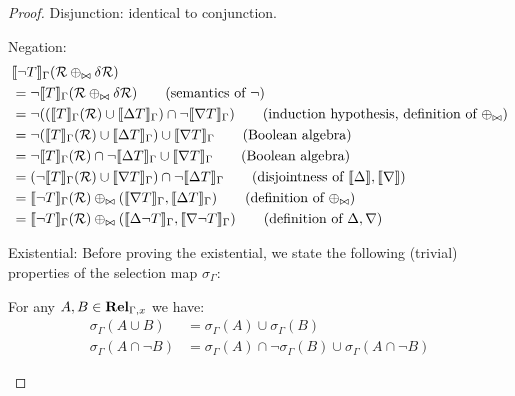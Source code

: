 \begin{proof}
  Disjunction: identical to conjunction.
  
  Negation:
  \begin{align*}
    &\sem{\neg T}_\Gamma(\semR \twist \diffR)\\
    &= \neg \sem{T}_\Gamma(\semR \twist \diffR) \tag{semantics of $\neg$}\\
    &= \neg ((\sem{T}_\Gamma(\semR) \cup \upsem{T}_\Gamma) \cap \neg \downsem{T}_\Gamma) \tag{induction hypothesis, definition of $\twist$}\\
    &= \neg (\sem{T}_\Gamma(\semR) \cup \upsem{T}_\Gamma) \cup \downsem{T}_\Gamma \tag{Boolean algebra}\\
    &= \neg \sem{T}_\Gamma(\semR) \cap \neg \upsem{T}_\Gamma \cup \downsem{T}_\Gamma \tag{Boolean algebra}\\
    &= (\neg \sem{T}_\Gamma(\semR) \cup \downsem{T}_\Gamma) \cap \neg \upsem{T}_\Gamma \tag{disjointness of $\upsem{}, \downsem{}$}\\
    &= \sem{\neg T}_\Gamma(\semR) \twist (\downsem{T}_\Gamma, \upsem{T}_\Gamma) \tag{definition of $\twist$}\\
    &= \sem{\neg T}_\Gamma(\semR) \twist (\upsem{\neg T}_\Gamma, \downsem{\neg T}_\Gamma) \tag{definition of $\updiff{}, \downdiff{}$}
  \end{align*}

  Existential:
  Before proving the existential, we state the following (trivial) properties of the selection map $\sigma_\Gamma$:
  \begin{prop}
    \label{prop:sigmaDist}
    For any $A, B \in \mathbf{Rel}_{\Gamma, x}$ we have:
    \begin{align*}
      \sigma_\Gamma(A \cup B) &= \sigma_\Gamma(A) \cup \sigma_\Gamma(B)\\
      \sigma_\Gamma (A \cap \neg B) &= \sigma_\Gamma(A) \cap \neg \sigma_\Gamma(B) \cup \sigma_\Gamma(A \cap \neg B)
    \end{align*}
  \end{prop}
  

\end{proof}
